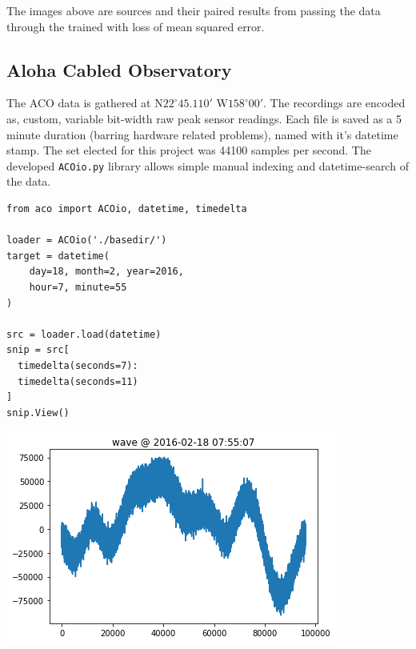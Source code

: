 \documentclass{article}
\newenvironment{Figure}
  {\par\medskip\noindent\minipage{\linewidth}}
  {\endminipage\par\medskip}
\begin{document}
\begin{multicols}{2}
The images above are sources and their paired results from passing the \mnist data through
the trained \vae with loss of mean squared error.





\subsection{Aloha Cabled Observatory}

The ACO data is gathered at N$22^\circ45.110'$ W$158^\circ00'$. The recordings are
encoded as, custom, variable bit-width raw peak sensor readings. Each file is saved
as a 5 minute duration (barring hardware related problems), named with it's datetime
stamp. The set elected for this project was 44100 samples per second. The developed
\texttt{ACOio.py} library allows simple manual indexing and datetime-search of the data.



\begin{lstlisting}
from aco import ACOio, datetime, timedelta

loader = ACOio('./basedir/')
target = datetime(
    day=18, month=2, year=2016,
    hour=7, minute=55
)

src = loader.load(datetime)
snip = src[
  timedelta(seconds=7):
  timedelta(seconds=11)
]
snip.View()
\end{lstlisting}



\begin{Figure}


  \includegraphics[width=\columnwidth]{./rawwave.png}
  \label{fig:rawwav}
\end{Figure}


\end{multicols}
\end{document}

